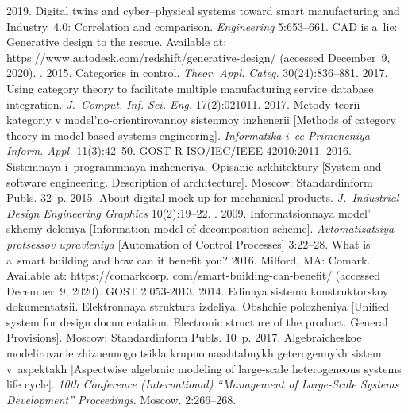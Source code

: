 \begin{multicols}{2}

\renewcommand{\bibname}{\protect\rmfamily References}

{\small\frenchspacing
{%
\begin{thebibliography}{99}
 2019. Digital twins and  
cyber--physical systems toward smart manufacturing and Industry~4.0: Correlation 
and comparison. \textit{Engineering} 5:653--661.
CAD is a~lie: Generative design to the rescue. Available at: {\sf 
https://www.autodesk.com/redshift/generative-design/} (accessed December~9, 
2020).
. 2015. Categories in control. \textit{Theor.  
Appl. Categ.} 30(24):836--881.
2017. Using category theory to facilitate multiple manufacturing service database 
integration. \textit{J.~Comput. Inf. Sci. Eng.} 17(2):021011.
 2017. Metody teorii kategoriy v model'no-orientirovannoy 
sistemnoy inzhenerii [Methods of category theory in model-based systems 
engineering]. \textit{Informatika i~ee Primeneniya~--- Inform. Appl.} 11(3):42--50.
GOST R ISO/IEC/IEEE 42010:2011. 2016. Sistemnaya i~programmnaya inzheneriya. 
Opisanie arkhitektury [System and software engineering. Description of 
architecture]. Moscow: Standardinform Publs. 32~p.
 2015. About digital mock-up for 
mechanical products. \textit{J.~Industrial Design Engineering Graphics} 
10(2):19--22.
. 2009. 
Informatsionnaya model' skhemy deleniya [Information model of decomposition scheme]. 
\textit{Avtomatizatsiya protsessov upravleniya} [Automation of Control 
Processes] 3:22--28.
What is a~smart building and how can it benefit you? 2016. Milford, MA: Comark.
Available at: {\sf 
https://comarkcorp. com/smart-building-can-benefit/} (accessed December~9, 2020).
GOST 2.053-2013. 2014. Edinaya sistema konstruktorskoy dokumentatsii. 
Elektronnaya struktura izdeliya. Obshchie polozheniya [Unified system for design 
documentation. Electronic structure of the product. General Provisions]. Moscow: 
Standardinform Publs. 10~p.
 2017. Algebraicheskoe modelirovanie zhiznennogo tsikla 
krupnomasshtabnykh geterogennykh sistem v~aspektakh [Aspectwise algebraic 
modeling of large-scale heterogeneous systems life cycle].
 \textit{10th Conference (International) ``Management of Large-Scale Systems 
Development'' Proceedings}. Moscow. 2:266--268.


\end{thebibliography}}}
\end{multicols}
